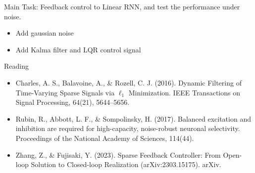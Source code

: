 \documentclass[12pt, a4paper]{article}
\begin{document}
\noindent
Main Task: Feedback control to Linear RNN, and test the performance under noise.

\begin{itemize}
    \item Add gaussian noise
    \item Add Kalma filter and LQR control signal
\end{itemize}

\noindent
Reading

\begin{itemize}
    \item Charles, A. S., Balavoine, A., \& Rozell, C. J. (2016). Dynamic Filtering of Time-Varying Sparse Signals via $\ell _1$ Minimization. IEEE Transactions on Signal Processing, 64(21), 5644–5656.
    \item Rubin, R., Abbott, L. F., \& Sompolinsky, H. (2017). Balanced excitation and inhibition are required for high-capacity, noise-robust neuronal selectivity. Proceedings of the National Academy of Sciences, 114(44).
    \item Zhang, Z., \& Fujisaki, Y. (2023). Sparse Feedback Controller: From Open-loop Solution to Closed-loop Realization (arXiv:2303.15175). arXiv.
\end{itemize}

\newpage
\end{document}
